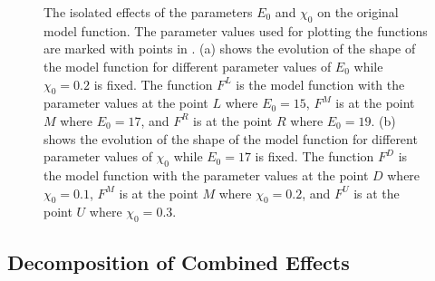 \begin{figure}
	\centering
	\caption[The isolated effects of the parameters on the original model function]{
		The isolated effects of the parameters $E_0$ and $\chi_0$ on the original model function.
		The parameter values used for plotting the functions are marked with points in .
		(a) shows the evolution of the shape of the model function for different parameter values of $E_0$ while $\chi_0 = 0.2$ is fixed.
		The function $F^L$ is the model function with the parameter values at the point $L$ where $E_0 = 15$,
		$F^M$ is at the point $M$ where $E_0 = 17$,
		and $F^R$ is at the point $R$ where $E_0 = 19$.
		(b) shows the evolution of the shape of the model function for different parameter values of $\chi_0$ while $E_0 = 17$ is fixed.
		The function $F^D$ is the model function with the parameter values at the point $D$ where $\chi_0 = 0.1$,
		$F^M$ is at the point $M$ where $\chi_0 = 0.2$,
		and $F^U$ is at the point $U$ where $\chi_0 = 0.3$.
	}
	\label{fig:setup.char.evolution.single}
\end{figure}

\subsection{Decomposition of Combined Effects}
\label{sec:yunus.param.effects.decomposition}

